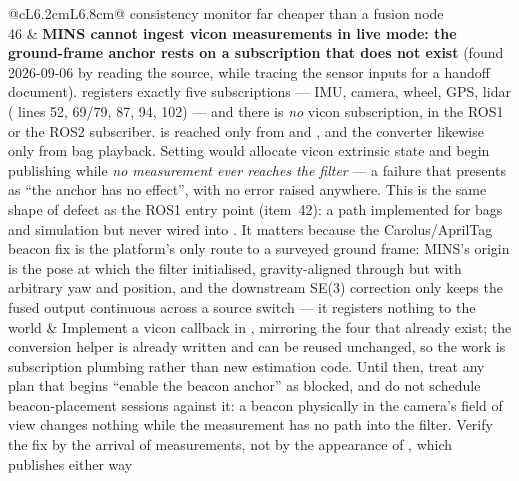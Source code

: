 \begin{longtable}{@{}cL{6.2cm}L{6.8cm}@{}}
    consistency monitor far cheaper than a fusion node \\
46 & \textbf{MINS cannot ingest vicon measurements in live mode: the
    ground-frame anchor rests on a subscription that does not exist}
    (found 2026-09-06 by reading the source, while tracing the sensor
    inputs for a handoff document).  registers exactly
    five subscriptions --- IMU, camera, wheel, GPS, lidar
    ( lines 52, 69/79, 87, 94, 102) --- and there
    is \emph{no} vicon subscription, in the ROS1 or the ROS2 subscriber.
     is reached only from
     and , and the
    converter  likewise only from bag
    playback. Setting   would
    allocate vicon extrinsic state and begin publishing
     while \emph{no measurement ever reaches the
    filter} --- a failure that presents as ``the anchor has no effect'',
    with no error raised anywhere. This is the same shape of defect as the
    ROS1 entry point (item~42): a path implemented for bags and simulation
    but never wired into . It matters because the
    Carolus/AprilTag beacon fix is the platform's only route to a surveyed
    ground frame: MINS's  origin is the pose at which the
    filter initialised, gravity-aligned through
     but with arbitrary yaw and position,
    and the downstream  SE(3) correction only keeps
    the fused output continuous across a source switch --- it registers
    nothing to the world &
    Implement a vicon callback in , mirroring the four
    that already exist; the conversion helper
     is already written and can be reused
    unchanged, so the work is subscription plumbing rather than new
    estimation code. Until then, treat any plan that begins ``enable the
    beacon anchor'' as blocked, and do not schedule beacon-placement
    sessions against it: a beacon physically in the camera's field of view
    changes nothing while the measurement has no path into the filter.
    Verify the fix by the arrival of measurements, not by the appearance of
    , which publishes either way \\


\end{longtable}
